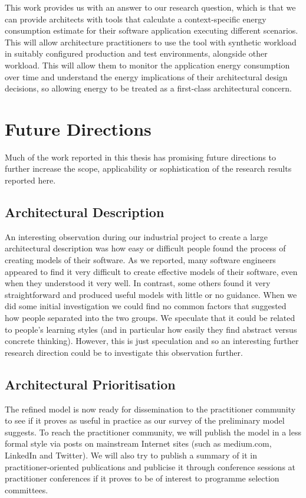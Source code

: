 This work provides us with an answer to our research question, which is that we can provide architects with tools that calculate a context-specific energy consumption estimate for their software application executing different scenarios.  This will allow architecture practitioners to use the tool with synthetic workload in suitably configured production and test environments, alongside other workload.  This will allow them to monitor the application energy consumption over time and understand the energy implications of their architectural design decisions, so allowing energy to be treated as a first-class architectural concern.

\section{Future Directions}

Much of the work reported in this thesis has promising future directions to further increase the scope, applicability or sophistication of the research results reported here.

\subsection{Architectural Description}

An interesting observation during our industrial project to create a large architectural description was how easy or difficult people found the process of creating models of their software.  As we reported, many software engineers appeared to find it very difficult to create effective models of their software, even when they understood it very well.  In contrast, some others found it very straightforward and produced useful models with little or no guidance.  When we did some initial investigation we could find no common factors that suggested how people separated into the two groups.  We speculate that it could be related to people's learning styles (and in particular how easily they find abstract versus concrete thinking).  However, this is just speculation and so an interesting further research direction could be to investigate this observation further.

\subsection{Architectural Prioritisation}

The refined model is now ready for dissemination to the practitioner community to see if it proves as useful in practice as our survey of the preliminary model suggests.  To reach the practitioner community, we will publish the model in a less formal style via posts on mainstream Internet sites (such as medium.com, LinkedIn and Twitter).  We will also try to publish a summary of it in practitioner-oriented publications and publicise it through conference sessions at practitioner conferences if it proves to be of interest to programme selection committees.

